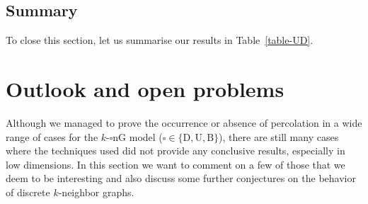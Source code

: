 \documentclass[a4paper, oneside, 11pt]{amsart}
\theoremstyle{definition}
\newcommand{\1}{\mathbbm{1}}
\newcommand{\0}{\mathbf{o}}
\numberwithin{equation}{section}
\begin{document}
\subsection{Summary}
To close this section, let us summarise our results in Table~\ref{table-UD}. 
\begin{table}[h]
\centering
{}
\caption{Percolation results and open cases for the BnG/DnG/UnG. For given $k,d$, `yes' means that the given graph percolates, `no' means that it does not, while `open' means that the given case is (at least partially) open.}
\label{table-UD}
\end{table}


\section{Outlook and open problems}\label{sec:discussion}
Although we managed to prove the occurrence or absence of percolation in a wide range of cases for the $k$-$\square$nG model ($\square\in\{\mathrm{D,U,B}\}$), there are still many cases where the techniques used did not provide any conclusive results, especially in low dimensions. In this section we want to comment on a few of those that we deem to be interesting and also discuss some further conjectures on the behavior of discrete $k$-neighbor graphs. 
\end{document}
